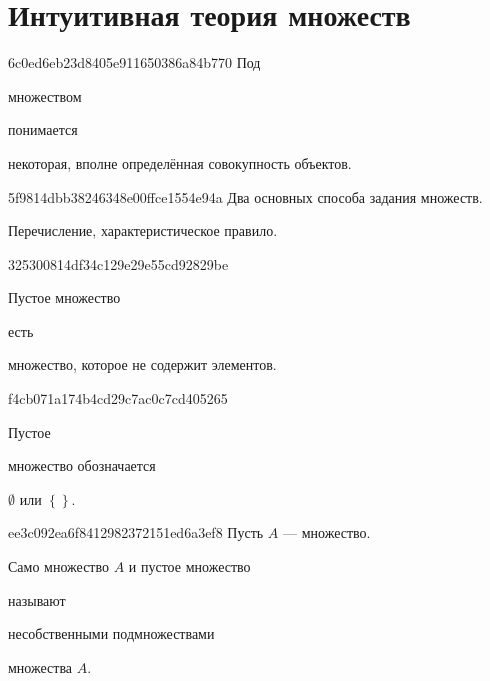 


\section{Интуитивная теория множеств}
\begin{note}{6c0ed6eb23d8405e911650386a84b770}
    Под \begin{icloze}{2}множеством\end{icloze} понимается \begin{icloze}{1}некоторая, вполне определённая совокупность объектов.\end{icloze}
\end{note}

\begin{note}{5f9814dbb38246348e00ffce1554e94a}
    Два основных способа задания множеств.

    \begin{cloze}{1}
        Перечисление, характеристическое правило.
    \end{cloze}
\end{note}

\begin{note}{325300814df34c129e29e55cd92829be}
    \begin{icloze}{2}Пустое множество\end{icloze} есть \begin{icloze}{1}множество, которое не содержит элементов.\end{icloze}
\end{note}

\begin{note}{f4cb071a174b4cd29c7ac0c7cd405265}
    \begin{icloze}{2}Пустое\end{icloze} множество обозначается \begin{icloze}{1}\({ \emptyset }\) или \({ \left\{  \right\} }\).\end{icloze}
\end{note}

\begin{note}{ee3c092ea6f8412982372151ed6a3ef8}
    Пусть \({ A }\) --- множество.
    \begin{icloze}{1}Само множество \({ A }\) и пустое множество\end{icloze} называют \begin{icloze}{2}несобственными подмножествами\end{icloze} множества \({ A }\).
\end{note}

